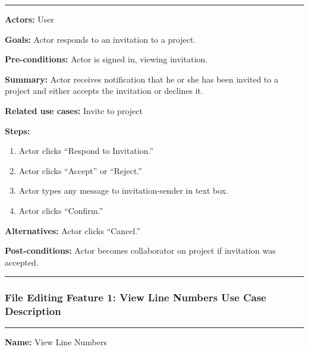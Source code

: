 \documentclass[twoside,letterpaper]{article}
\begin{document}
	\vspace{2pt}
	\hrule
	\vspace{8pt}
	\noindent \textbf{Actors:} User  \newline
	
	\noindent \textbf{Goals:} Actor responds to an invitation to a project.\newline
	
	\noindent  \textbf{Pre-conditions:} Actor is signed in, viewing invitation.  \newline
	
	\noindent \textbf{Summary:} Actor receives notification that he or she has been invited to a project and either accepts the invitation or declines it. \newline
	
	\noindent \textbf{Related use cases:} Invite to project \newline
	
	\noindent \textbf{Steps:} \begin{enumerate}
	  \item Actor clicks ``Respond to Invitation.''
	  \item Actor clicks ``Accept'' or ``Reject.''
	  \item Actor types any message to invitation-sender in text box.
	  \item Actor clicks ``Confirm.''
	 \end{enumerate}
	 
	\noindent  \textbf{Alternatives:} Actor clicks ``Cancel.'' \newline
	
	\noindent  \textbf{Post-conditions:} Actor becomes collaborator on project if invitation was accepted. \newline
	\vspace{8pt}
	\hrule
	\vspace{20pt}
	\newpage
	
	\subsubsection[File Editing Feature 1: View Line Numbers]{\rmfamily\bfseries\color{black}
		File Editing Feature 1: View Line Numbers Use Case Description}
	\hypertarget{RefHeading22059017292}{}
	
	\vspace{2pt}
	\hrule
	\vspace{8pt}
		\noindent\textbf{Name:} View Line Numbers \newline
		
\end{document}

